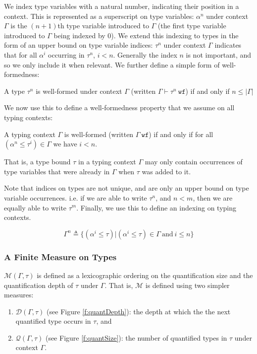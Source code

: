 \documentclass[runningheads]{llncs}
\begin{document}
We index type variables with a natural number, indicating their position in a context.
This is represented as a superscript on type variables: $\alpha^n$ under context $\Gamma$ is the $(n + 1)$th type variable introduced to $\Gamma$ (the first type variable introduced to $\Gamma$ being indexed by 0).
We extend this indexing to types in the form of an upper bound on type variable indices: $\tau^n$ under context
$\Gamma$ indicates that for all $\alpha^i$ occurring in $\tau^n$, $i < n$.
Generally the index $n$ is not important, and so we only include it when relevant.
We further define a simple form of well-formedness:
\begin{definition}
A type $\tau^n$ is well-formed under context $\Gamma$ (written $\Gamma \vdash \tau^n\ \texttt{wf}$) 
if and only if $n \leq |\Gamma|$
\end{definition}
We now use this to define a well-formedness property that we assume on all typing contexts:
\begin{definition}
\label{def:ctxwf}
A typing context $\Gamma$ is well-formed (written $\Gamma\ \texttt{wf}$) if and only if
for all $(\alpha^n \leqslant \tau^i) \in \Gamma$ we have $i < n$.
\end{definition}
That is, a type bound $\tau$ in a typing context $\Gamma$ may only contain occurrences of type variables that were 
already in $\Gamma$ when $\tau$ was added to it.

Note that indices on types are not unique, and are only an upper bound on type variable occurrences. i.e. if we are able to write $\tau^n$, 
and $n < m$, then we are equally able to write $\tau^m$.
Finally, we use this to define an indexing on typing contexts.
\begin{definition}
$$\Gamma^n \triangleq \{ (\alpha^i \leqslant \tau) | (\alpha^i \leqslant \tau) \in  \Gamma \ \text{and}\ i \leq n\}$$
\end{definition}

\subsubsection{A Finite Measure on Types}


$\mathcal{M}(\Gamma, \tau)$ is defined as a lexicographic ordering on the quantification size and the quantification depth of $\tau$
under $\Gamma$. That is, $\mathcal{M}$ is defined using two simpler measures: 
\begin{enumerate}
\item
$\mathcal{D}(\Gamma, \tau)$ (see Figure \ref{f:quantDepth}): the depth at which the the next quantified type occurs in $\tau$, and
\item
$\mathcal{Q}(\Gamma, \tau)$ (see Figure \ref{f:quantSize}): the number of quantified types in $\tau$ under context $\Gamma$.
\end{enumerate}
\end{document}
